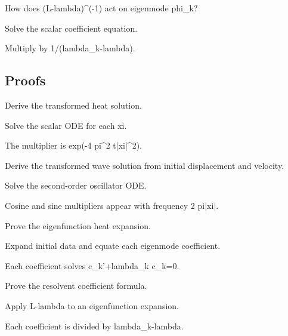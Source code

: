 \begin{exercise}[Resolvent]\label{exr:iii28-expand-05}
How does (L-lambda)\textasciicircum{}(-1) act on eigenmode phi\_k?
\end{exercise}
\begin{hint}
Solve the scalar coefficient equation.
\end{hint}
\begin{solution}
Multiply by 1/(lambda\_k-lambda).
\end{solution}

\subsection*{Proofs}

\begin{exercise}\label{exr:iii28-expand-06}
Derive the transformed heat solution.
\end{exercise}
\begin{hint}
Solve the scalar ODE for each xi.
\end{hint}
\begin{solution}
The multiplier is exp(-4 pi\textasciicircum{}2 t|xi|\textasciicircum{}2).
\end{solution}

\begin{exercise}\label{exr:iii28-expand-07}
Derive the transformed wave solution from initial displacement and velocity.
\end{exercise}
\begin{hint}
Solve the second-order oscillator ODE.
\end{hint}
\begin{solution}
Cosine and sine multipliers appear with frequency 2 pi|xi|.
\end{solution}

\begin{exercise}\label{exr:iii28-expand-08}
Prove the eigenfunction heat expansion.
\end{exercise}
\begin{hint}
Expand initial data and equate each eigenmode coefficient.
\end{hint}
\begin{solution}
Each coefficient solves c\_k'+lambda\_k c\_k=0.
\end{solution}

\begin{exercise}\label{exr:iii28-expand-09}
Prove the resolvent coefficient formula.
\end{exercise}
\begin{hint}
Apply L-lambda to an eigenfunction expansion.
\end{hint}
\begin{solution}
Each coefficient is divided by lambda\_k-lambda.
\end{solution}

